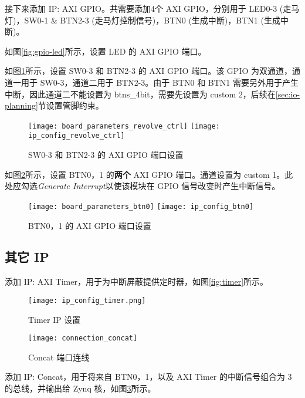 \documentclass{sjtureport}
\begin{document}
接下来添加 IP: AXI GPIO。共需要添加4个 AXI GPIO，分别用于 LED0-3 (走马灯)，SW0-1 \& BTN2-3 (走马灯控制信号)，BTN0 (生成中断)，BTN1 (生成中断)。

如图\ref{fig:gpio-led}所示，设置 LED 的 AXI GPIO 端口。

如图\ref{fig:gpio-revolve-ctrl}所示，设置 SW0-3 和 BTN2-3 的 AXI GPIO 端口。该 GPIO 为双通道，通道一用于 SW0-3，通道二用于 BTN2-3。由于 BTN0 和 BTN1 需要另外用于产生中断，因此通道二不能设置为 btns\_4bit，需要先设置为 custom \SI{2}{\bit}，后续在\ref{sec:io-planning}节设置管脚约束。

\begin{figure}[!htp]
	\centering
	\texttt{[image: board\_parameters\_revolve\_ctrl]}
	\hfill
	\texttt{[image: ip\_config\_revolve\_ctrl]}
	\caption{SW0-3 和 BTN2-3 的 AXI GPIO 端口设置}
	\label{fig:gpio-revolve-ctrl}
\end{figure}

如图\ref{fig:gpio-btn0}所示，设置 BTN0，1 的\textbf{两个} AXI GPIO 端口。通道设置为 custom \SI{1}{\bit}。此处应勾选\textit{Generate Interrupt}以使该模块在 GPIO 信号改变时产生中断信号。

\begin{figure}[!htp]
	\centering
	\texttt{[image: board\_parameters\_btn0]}
	\hfill
	\texttt{[image: ip\_config\_btn0]}
	\caption{BTN0，1 的 AXI GPIO 端口设置}
	\label{fig:gpio-btn0}
\end{figure}

\subsection{其它 IP}

添加 IP: AXI Timer，用于为中断屏蔽提供定时器，如图\ref{fig:timer}所示。

\begin{figure}[!htp]
	\centering
	\begin{minipage}{0.48\textwidth}
		\centering
		\texttt{[image: ip\_config\_timer.png]}
		\caption{Timer IP 设置}
		\label{fig:timer}
	\end{minipage}
	\begin{minipage}{0.48\textwidth}
		\centering
		\texttt{[image: connection\_concat]}
		\caption{Concat 端口连线}
		\label{fig:concat}
	\end{minipage}
\end{figure}

添加 IP: Concat，用于将来自 BTN0，1，以及 AXI Timer 的中断信号组合为 \SI{3}{\bit} 的总线，并输出给 Zynq 核，如图\ref{fig:concat}所示。
\end{document}
